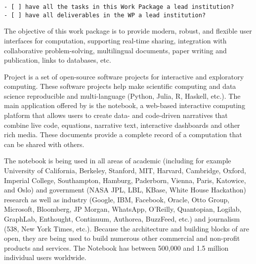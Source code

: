 \begin{draft}
\begin{verbatim}
- [ ] have all the tasks in this Work Package a lead institution?
- [ ] have all deliverables in the WP a lead institution?
\end{verbatim}
\end{draft}


\begin{workpackage}[id=UI,wphases=0-48,
  title=User Interfaces,
  lead=SR,
  PSRM=12, %
  UVRM=2, %
  JURM=22, %
  USHRM=12, %
  LLRM=1, %
  SARM=18, %
  UKRM=1, %
  UBRM=1, %
  USORM=16, %
  SRRM=23]

\begin{wpobjectives}
  The objective of this work package is to provide modern, robust,
  and flexible user interfaces for computation, supporting real-time
  sharing, integration with collaborative problem-solving,
  multilingual documents, paper writing and publication, links to
  databases, etc.
\end{wpobjectives}

\begin{wpdescription}
  Project \Jupyter is a set of open-source software projects for interactive and exploratory
  computing. These software projects help make scientific computing and data science reproducible
  and multi-language (Python, Julia, R, Haskell, etc.). The main application offered by \Jupyter is
  the \Jupyter notebook, a web-based interactive computing platform that allows users to create
  data- and code-driven narratives that combine live code, equations, narrative text, interactive
  dashboards and other rich media. These documents provide a complete record of a computation that
  can be shared with others.

  The \Jupyter notebook is being used in all areas of academic
  (including for example University of California, Berkeley, Stanford,
  MIT, Harvard, Cambridge, Oxford, Imperial College, Southampton,
  Hamburg, Paderborn, Vienna, Paris, Katowice, and Oslo) and
  government (NASA JPL, LBL, KBase, White House Hackathon) research as
  well as industry (Google, IBM, Facebook, Oracle, Otto Group,
  Microsoft, Bloomberg, JP Morgan, WhatsApp, O’Reilly, Quantopian,
  Logilab, GraphLab, Enthought, Continuum, Authorea, BuzzFeed, etc.)
  and journalism (538, New York Times, etc.). Because the architecture
  and building blocks of \Jupyter are open, they are being used to
  build numerous other commercial and non-profit products and
  services. The \Jupyter Notebook has between 500,000 and 1.5 million
  individual users worldwide.


\end{wpdescription}
\end{workpackage}
